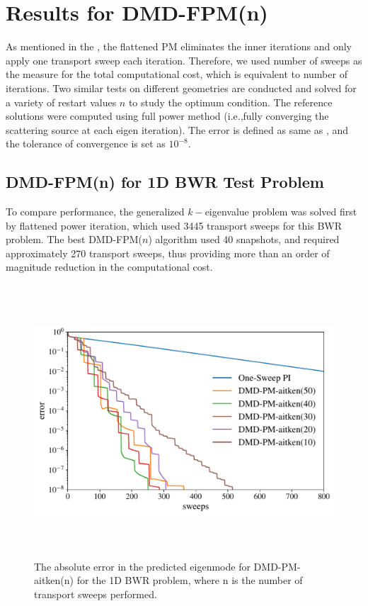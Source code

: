 \section{Results for DMD-FPM(n)}
As mentioned in the , the flattened PM eliminates the inner iterations and only apply one transport sweep each iteration.
Therefore, we used number of sweeps as the measure for the total computational cost, which is equivalent to number of iterations.
Two similar tests on different geometries are conducted and solved for a variety of restart values $n$ to study the optimum condition.
The reference solutions were computed using full power method (i.e.,fully converging the scattering source at each eigen iteration).
The error is defined as same as , and the tolerance of convergence is set as $10^{-8}$.

\subsection{DMD-FPM(n) for 1D BWR Test Problem}

To compare performance, the generalized $k-$eigenvalue problem was solved first by flattened power iteration, which used 3445 transport sweeps for this BWR problem.
The best DMD-FPM($n$) algorithm used 40 snapshots, and required approximately 270 transport sweeps, thus providing more than an order of magnitude reduction in the computational cost.

\begin{figure}[htb]%
    \centering
    \includegraphics[height=4.0in]{tex/figures/dmd_ospi_semilog_1d.pdf}
    \caption{The absolute error in the predicted eigenmode for DMD-PM-aitken(n) for the 1D BWR problem, where n is the number of transport sweeps performed.}
    \label{fig:DMD-FPM_1d}
\end{figure}

